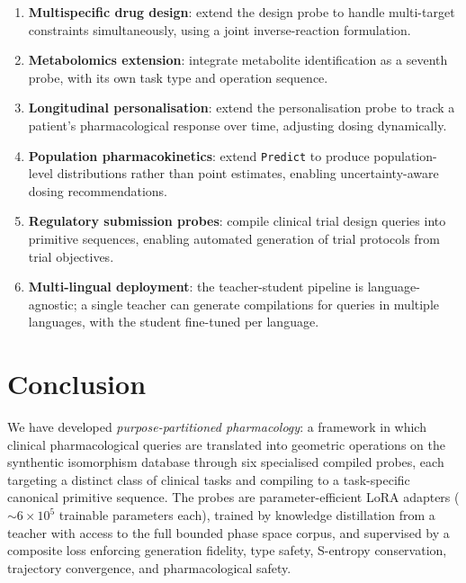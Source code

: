 \documentclass[11pt,twocolumn,a4paper]{article}
\theoremstyle{definition}
\theoremstyle{remark}
\begin{document}
\begin{enumerate}[nosep,leftmargin=*]
\item \textbf{Multispecific drug design}: extend the design probe to handle multi-target constraints simultaneously, using a joint inverse-reaction formulation.

\item \textbf{Metabolomics extension}: integrate metabolite identification as a seventh probe, with its own task type and operation sequence.

\item \textbf{Longitudinal personalisation}: extend the personalisation probe to track a patient's pharmacological response over time, adjusting dosing dynamically.

\item \textbf{Population pharmacokinetics}: extend \texttt{Predict} to produce population-level distributions rather than point estimates, enabling uncertainty-aware dosing recommendations.

\item \textbf{Regulatory submission probes}: compile clinical trial design queries into primitive sequences, enabling automated generation of trial protocols from trial objectives.

\item \textbf{Multi-lingual deployment}: the teacher-student pipeline is language-agnostic; a single teacher can generate compilations for queries in multiple languages, with the student fine-tuned per language.
\end{enumerate}

\section{Conclusion}
\label{sec:conclusion}

We have developed \emph{purpose-partitioned pharmacology}: a framework in which clinical pharmacological queries are translated into geometric operations on the synthentic isomorphism database through six specialised compiled probes, each targeting a distinct class of clinical tasks and compiling to a task-specific canonical primitive sequence. The probes are parameter-efficient LoRA adapters ($\sim\!6 \times 10^5$ trainable parameters each), trained by knowledge distillation from a teacher with access to the full bounded phase space corpus, and supervised by a composite loss enforcing generation fidelity, type safety, S-entropy conservation, trajectory convergence, and pharmacological safety.
\end{document}
